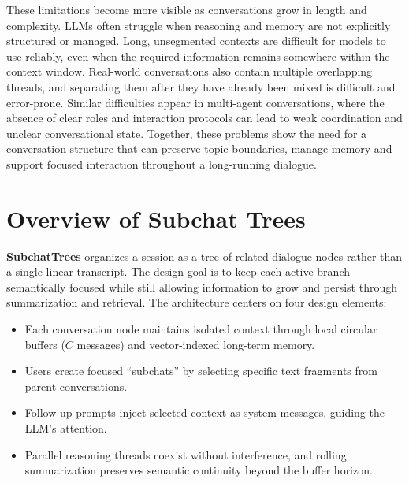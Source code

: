 These limitations become more visible as conversations grow in length and complexity. LLMs often struggle when reasoning and memory are not explicitly structured or managed. Long, unsegmented contexts are difficult for models to use reliably, even when the required information remains somewhere within the context window. Real-world conversations also contain multiple overlapping threads, and separating them after they have already been mixed is difficult and error-prone. Similar difficulties appear in multi-agent conversations, where the absence of clear roles and interaction protocols can lead to weak coordination and unclear conversational state. Together, these problems show the need for a conversation structure that can preserve topic boundaries, manage memory and support focused interaction throughout a long-running dialogue.

\section{Overview of Subchat Trees}\label{subsec:approach}
\textbf{SubchatTrees} organizes a session as a tree of related dialogue nodes rather than a single linear transcript. The design goal is to keep each active branch semantically focused while still allowing information to grow and persist through summarization and retrieval. The architecture centers on four design elements:




\begin{itemize}
    \item Each conversation node maintains isolated context through local circular buffers ($C$ messages) and vector-indexed long-term memory.
    \item Users create focused ``subchats'' by selecting specific text fragments from parent conversations.
    \item Follow-up prompts inject selected context as system messages, guiding the LLM's attention.
    \item Parallel reasoning threads coexist without interference, and rolling summarization preserves semantic continuity beyond the buffer horizon.
\end{itemize}

